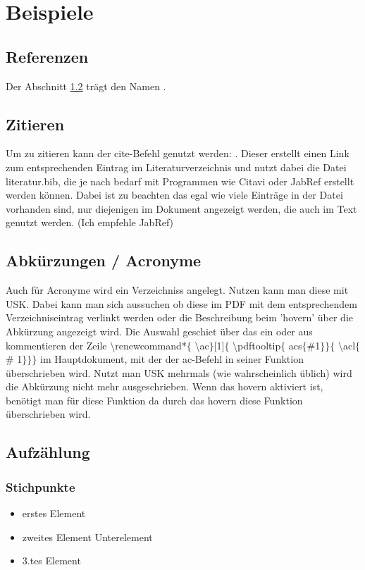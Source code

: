 
\chapter{Beispiele}
\section{Referenzen}
Der Abschnitt \ref{sec:zitieren} trägt den Namen .

\section{Zitieren} \label{sec:zitieren}
Um zu zitieren kann der cite-Befehl genutzt werden: \cite{Wer2011}. Dieser erstellt einen Link zum entsprechenden Eintrag im Literaturverzeichnis und nutzt dabei die Datei literatur.bib, die je nach bedarf mit Programmen wie Citavi oder JabRef erstellt werden können. Dabei ist zu beachten das egal wie viele Einträge in der Datei vorhanden sind, nur diejenigen im Dokument angezeigt werden, die auch im Text genutzt werden. (Ich empfehle JabRef)

\section{Abkürzungen / Acronyme}
Auch für Acronyme wird ein Verzeichniss angelegt. Nutzen kann man diese mit \ac{USK}. Dabei kann man sich aussuchen ob diese im PDF mit dem entsprechendem Verzeichniseintrag verlinkt werden oder die Beschreibung beim 'hovern' über die Abkürzung angezeigt wird. Die Auswahl geschiet über das ein oder aus kommentieren der Zeile \textbackslash renewcommand*$\lbrace$ \textbackslash ac$\rbrace$[1]$\lbrace$ \textbackslash pdftooltip$\lbrace$ acs$\lbrace$\#1$ \rbrace\rbrace\lbrace$ \textbackslash acl$\lbrace$\# 1$\rbrace\rbrace\rbrace$ im Hauptdokument, mit der der ac-Befehl in seiner Funktion überschrieben wird. Nutzt man \ac{USK} mehrmals (wie wahrscheinlich üblich) wird die Abkürzung nicht mehr ausgeschrieben. Wenn das hovern aktiviert ist, benötigt man für diese Funktion  da durch das hovern diese Funktion überschrieben wird.

\section{Aufzählung}
\subsection{Stichpunkte}
\begin{itemize}
	\item erstes Element
	\item zweites Element
	\subitem  Unterelement
	\item 3.tes Element
\end{itemize}

